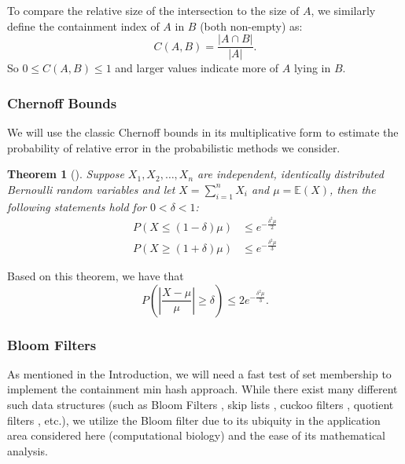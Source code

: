 \documentclass[11pt,reqno]{amsart}
\newtheorem{theorem}{Theorem}[section]
\theoremstyle{remark}
\numberwithin{equation}{section}
\begin{document}
To compare the relative size of the intersection to the size of $A$, we similarly define the containment index of $A$ in $B$ (both non-empty) as:
$$
C(A,B)=\frac{|A\cap B|}{|A|}.
$$
So $0\leq C(A,B)\leq 1$ and larger values indicate more of $A$ lying in $B$.

\subsubsection{Chernoff Bounds}
We will use the classic Chernoff bounds in its multiplicative form to estimate the probability of relative error in the probabilistic methods we consider.
 \begin{theorem}[{\cite[Thm 4.4-4.5]{mitzenmacher2005probability}}]
 \label{chernoffbd}
Suppose $X_1,X_2,\dots,X_n$ are independent, identically distributed Bernoulli random variables and let $X = \sum_{i=1}^nX_i$ and $\mu=\mathbb{E}(X)$, then the following statements hold for $0<\delta<1$:
\begin{align}
P(X\leq (1-\delta)\mu)&\leq e^{-\frac{\delta^2\mu}{2}}\label{chernoffbd1}\\
P(X\geq (1+\delta)\mu)&\leq e^{-\frac{\delta^2\mu}{3}}\label{chernoffbd2}
\end{align}
\end{theorem}  
Based on this theorem, we have that
\begin{equation}
\label{twosidedchernoff}
P\left(\left|\frac{X-\mu}{\mu}\right|\geq \delta \right)\leq 2e^{-\frac{\delta^2\mu}{3}}.
\end{equation}

\subsubsection{Bloom Filters}
As mentioned in the Introduction, we will need a fast test of set membership to implement the containment min hash approach. While there exist many different such data structures (such as Bloom Filters \cite{bloom1970space}, skip lists \cite{pugh1990skip}, cuckoo filters \cite{fan2014cuckoo}, quotient filters \cite{bender2012don}, etc.), we utilize the Bloom filter due to its ubiquity \cite{melsted2011efficient,heo2014bless,chikhi2012space,stranneheim2010classification,chu2014biobloom,ondov2016mash,solomon2016fast,pell2012scaling} in the application area considered here (computational biology) and the ease of its mathematical analysis.
\end{document}
